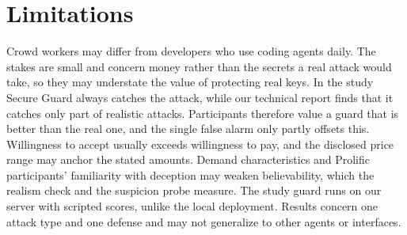 \documentclass[sigconf,nonacm]{acmart}
\begin{document}
\section{Limitations}
Crowd workers may differ from developers who use coding agents daily. The stakes are small and concern money rather than the secrets a real attack would take, so they may understate the value of protecting real keys. In the study Secure Guard always catches the attack, while our technical report finds that it catches only part of realistic attacks. Participants therefore value a guard that is better than the real one, and the single false alarm only partly offsets this. Willingness to accept usually exceeds willingness to pay, and the disclosed price range may anchor the stated amounts. Demand characteristics and Prolific participants' familiarity with deception may weaken believability, which the realism check and the suspicion probe measure. The study guard runs on our server with scripted scores, unlike the local deployment. Results concern one attack type and one defense and may not generalize to other agents or interfaces.
\end{document}
